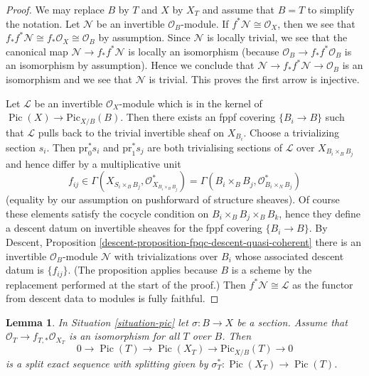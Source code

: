 \documentclass{stacks-project}
\theoremstyle{plain}
\newtheorem{lemma}[subsection]{Lemma}
\theoremstyle{definition}
\theoremstyle{remark}
\numberwithin{equation}{subsection}
\def\Pic{\mathop{\mathrm{Pic}}\nolimits}
\def\Picardfunctor{\mathrm{Pic}}
\begin{document}
\begin{proof}
We may replace $B$ by $T$ and $X$ by $X_T$ and assume that $B = T$
to simplify the notation. Let $\mathcal{N}$ be an invertible
$\mathcal{O}_B$-module. If $f^*\mathcal{N} \cong \mathcal{O}_X$, then
we see that $f_*f^*\mathcal{N} \cong f_*\mathcal{O}_X \cong \mathcal{O}_B$
by assumption. Since $\mathcal{N}$ is locally trivial, we see that
the canonical map $\mathcal{N} \to f_*f^*\mathcal{N}$ is locally
an isomorphism (because $\mathcal{O}_B \to f_*f^*\mathcal{O}_B$
is an isomorphism by assumption). Hence we conclude that
$\mathcal{N} \to f_*f^*\mathcal{N} \to \mathcal{O}_B$ is an isomorphism
and we see that $\mathcal{N}$ is trivial. This proves the first arrow
is injective.

\medskip\noindent
Let $\mathcal{L}$ be an invertible $\mathcal{O}_X$-module which is in
the kernel of $\Pic(X) \to \Picardfunctor_{X/B}(B)$. Then there exists
an fppf covering $\{B_i \to B\}$ such that $\mathcal{L}$ pulls back
to the trivial invertible sheaf on $X_{B_i}$. Choose a trivializing
section $s_i$. Then $\text{pr}_0^*s_i$ and $\text{pr}_1^*s_j$ are both
trivialising sections of $\mathcal{L}$ over $X_{B_i \times_B B_j}$
and hence differ by a multiplicative unit
$$
f_{ij} \in
\Gamma(X_{S_i \times_B B_j}, \mathcal{O}_{X_{B_i \times_B B_j}}^*) =
\Gamma(B_i \times_B B_j, \mathcal{O}_{B_i \times_N B_j}^*)
$$
(equality by our assumption on pushforward of structure sheaves).
Of course these elements satisfy the cocycle condition on
$B_i \times_B B_j \times_B B_k$, hence they define a descent datum
on invertible sheaves for the fppf covering $\{B_i \to B\}$.
By Descent, Proposition \ref{descent-proposition-fpqc-descent-quasi-coherent}
there is an invertible $\mathcal{O}_B$-module $\mathcal{N}$
with trivializations over $B_i$ whose associated descent datum is
$\{f_{ij}\}$. (The proposition applies because $B$ is a scheme
by the replacement performed at the start of the proof.)
Then $f^*\mathcal{N} \cong \mathcal{L}$ as the
functor from descent data to modules is fully faithful.
\end{proof}

\begin{lemma}
\label{lemma-flat-geometrically-connected-fibres-with-section}
In Situation \ref{situation-pic} let $\sigma : B \to X$ be a section.
Assume that $\mathcal{O}_T \to f_{T, *}\mathcal{O}_{X_T}$ is an isomorphism
for all $T$ over $B$. Then
$$
0 \to \Pic(T) \to \Pic(X_T) \to \Picardfunctor_{X/B}(T) \to 0
$$
is a split exact sequence with splitting given by
$\sigma_T^* : \Pic(X_T) \to \Pic(T)$.
\end{lemma}
\end{document}
